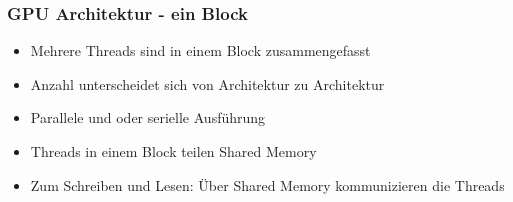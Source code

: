 \documentclass{sikslides}
\begin{document}
\begin{frame}
  \frametitle{GPU Architektur - ein Block}
  \begin{itemize}
  \item Mehrere Threads sind in einem Block zusammengefasst
\bigskip
  \item Anzahl unterscheidet sich von Architektur zu Architektur
\bigskip
  \item Parallele und oder serielle Ausführung
\bigskip
  \item Threads in einem Block teilen Shared Memory
\bigskip
  \item Zum Schreiben und Lesen: Über Shared Memory kommunizieren die Threads 
  \end{itemize}
\end{frame}


\end{document}
